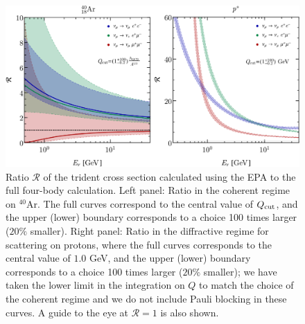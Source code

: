 %
\begin{figure}[t]
	\centering
	\includegraphics[width=\textwidth]{figs/XSec_ratio.pdf}%
	\caption{\label{fig:comparison4PS_EPA} 
    Ratio $\mathcal{R}$ of the trident cross section calculated using 
    the EPA to the full four-body calculation. 
    Left panel: Ratio in the coherent regime on $^{40}$Ar. The full curves correspond to the central value of $Q_{\rm cut}$, and the upper (lower) boundary corresponds to a choice 100 times larger ($20\%$ smaller). 
Right  panel: Ratio in the diffractive regime for scattering on protons, where the full curves corresponds to the central value of $1.0$ GeV, and the upper (lower) boundary corresponds to a choice 100 times larger ($20\%$ smaller); we have taken the lower limit in the integration on $Q$ to match the choice of the coherent regime and we do not include Pauli blocking in these curves. A guide to the eye at $\mathcal{R} = 1$ is also shown.}
\end{figure}

